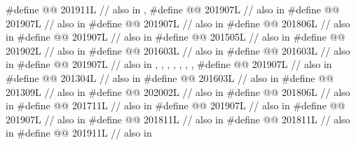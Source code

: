 \begin{codeblock}
#define @@       201911L // also in , 
#define @@                       201907L // also in 
#define @@                           201907L // also in 
#define @@                        201907L // also in 
#define @@                          201806L // also in 
#define @@                            201907L // also in 
#define @@                     201505L // also in 
#define @@              201902L // also in 
#define @@              201603L // also in 
#define @@                              201603L // also in 
#define @@                           201907L
  // also in , , , , , , , 
#define @@                            201907L // also in 
#define @@                       201304L // also in 
#define @@                             201603L // also in 
#define @@                      201309L // also in 
#define @@                          202002L // also in 
#define @@              201806L // also in 
#define @@                 201711L // also in 
#define @@           201907L // also in 
#define @@              201907L // also in 
#define @@                201811L // also in 
#define @@                  201811L // also in 
#define @@                 201911L // also in 

\end{codeblock}
